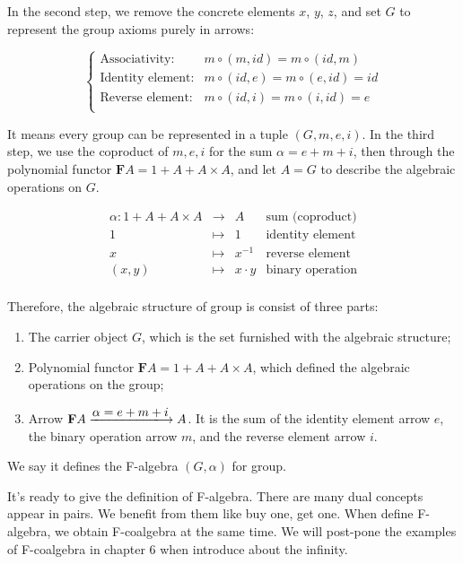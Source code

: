 \documentclass{article}
\begin{document}
\begin{example}
In the second step, we remove the concrete elements $x$, $y$, $z$, and set $G$ to represent the group axioms purely in arrows:

\[
\begin{cases}
\text{Associativity:} & m \circ (m, id) = m \circ (id, m) \\
\text{Identity element:} & m \circ (id, e) = m \circ (e, id) = id \\
\text{Reverse element:} & m \circ (id, i) = m \circ (i, id) = e \\
\end{cases}
\]

It means every group can be represented in a tuple $(G, m, e, i)$. In the third step, we use the coproduct of $m, e, i$ for the sum $\alpha = e + m + i$, then through the polynomial functor $\mathbf{F} A = 1 + A + A \times A$, and let $A = G$ to describe the algebraic operations on $G$.

\[
\begin{array}{rcll}
\alpha : 1 + A + A \times A & \longrightarrow & A & \text{sum (coproduct)}\\
1 & \longmapsto & 1 & \text{identity element}  \\
x & \longmapsto & x^{-1} & \text{reverse element} \\
(x, y) & \longmapsto & x \cdot y & \text{binary operation} \\
\end{array}
\]

Therefore, the algebraic structure of group is consist of three parts:

\begin{enumerate}
  \item The carrier object $G$, which is the set furnished with the algebraic structure;
  \item Polynomial functor $\mathbf{F} A = 1 + A + A \times A$, which defined the algebraic operations on the group;
  \item Arrow $\mathbf{F} A \arrowto{\alpha = e + m + i} A$. It is the sum of the identity element arrow $e$, the binary operation arrow $m$, and the reverse element arrow $i$.
\end{enumerate}

We say it defines the F-algebra $(G, \alpha)$ for group.
\end{example}

 
It's ready to give the definition of F-algebra. There are many dual concepts appear in pairs. We benefit from them like buy one, get one. When define F-algebra, we obtain F-coalgebra at the same time. We will post-pone the examples of F-coalgebra in chapter 6 when introduce about the infinity.
\end{document}
